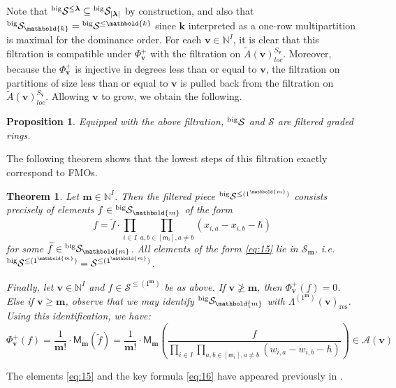 \documentclass[11pt,reqno]{amsart}
\renewcommand{\mathbf}{\mathbold}
\numberwithin{equation}{section}
\newtheorem{Theorem}[equation]{Theorem}
\newtheorem{Proposition}[equation]{Proposition}
\theoremstyle{definition}
\newcommand{\cA}{\mathcal{A}}
\newcommand{\cS}{\mathcal{S}}
\newcommand{\bk}{\mathbf{k}}
\newcommand{\bm}{\mathbf{m}}
\newcommand{\bv}{\mathbf{v}}
\newcommand{\NN}{\mathbb{N}}
\renewcommand{\tilde}[1]{\widetilde{#1}}
\newcommand{\leftexp}[2]{\vphantom{#2}^{#1} #2}
\renewcommand{\bv}{\mathbf{v}} %
\newcommand{\sm}{\mathsf{m}}
\newcommand{\M}{\mathsf{M}}
\newcommand{\vertexset}{I}
\newcommand{\GT}{\Lambda}
\newcommand{\bla}{{\boldsymbol{\lambda}}}
\newcommand{\qzast}{\cA}
\newcommand{\res}{\mathrm{res}}
\newcommand{\GKLO}[1]{\tilde{A}(#1)_{loc}}
\newcommand{\shu}{\cS}
\newcommand{\preshu}{\leftexp{\mathrm{big}}{\cS}}
\begin{document}
Note that $\preshu^{\leq \bla} \subseteq \preshu_{|\bla|}$ by construction, and also that $\preshu_{\bk} = \preshu^{\leq \bk}$ since $\bk$ interpreted as a one-row multipartition is maximal for the dominance order. 
For each $\bv \in \NN^I$, it is clear that this filtration is compatible under $\Phi^+_\bv$ with the filtration on $\GKLO{\bv}^{S_{\bv}}$.
Moreover, because the $\Phi_\bv^+$ is injective in degrees less than or equal to $\bv$, the filtration on partitions of size less than or equal to $\bv$ is pulled back from the filtration on $\GKLO{\bv}^{S_{\bv}}$. Allowing $\bv$ to grow, we obtain the following.

\begin{Proposition}
    Equipped with the above filtration, $\preshu$ and $\shu$ are filtered graded rings.
\end{Proposition}




The following theorem shows that the lowest steps of this filtration exactly correspond to FMOs. 
\begin{Theorem}
\label{thm:lowest-part-of-filtration-is-fmo}
Let $\bm \in \NN^\vertexset$. Then the filtered piece $\preshu^{\leq (1^{\bm})}$ consists precisely of elements $f \in \preshu_\bm$ of the form 
\begin{equation}
  \label{eq:15}
  f = \tilde{f} \cdot \prod_{i \in \vertexset} \prod_{a,b \in [\sm_i], a \neq b} (x_{i,a} - x_{i,b} - \hbar)  
\end{equation}
for some $\tilde{f} \in \preshu_{\bm}$. All elements of the form \eqref{eq:15} lie in $\cS_{\bm}$, i.e. $\preshu^{\leq (1^{\bm})} = \cS^{\leq (1^{\bm})}$.

Finally, let $\bv \in \NN^\vertexset$ and $f \in \shu^{\leq (1^\bm)}$ be as above.  If $\bv \not\geq \bm$, then $\Phi^+_\bv(f) = 0$.  Else if $\bv \geq \bm$, observe that we may identify $\preshu_{\bm}$ with $\GT^{(1^\bm)}(\bv)_{\res}$.  Using this identification, we have:
\begin{equation}
  \label{eq:16}
  \Phi^+_{\bv}\left( f\right)  = \frac{1}{\bm!} \cdot \M_{\bm}(\tilde{f}) 
  =  \frac{1}{\bm!} \cdot \M_{\bm}\left(\frac{f}{\prod_{i \in \vertexset} \prod_{a,b \in [\sm_i], a \neq b} (w_{i,a} - w_{i,b} - \hbar)  }\right) \in \qzast(\bv)
\end{equation}
\end{Theorem}
The elements \eqref{eq:15} and the key formula \eqref{eq:16} have appeared previously in \cite{FT2,Tsymbaliuk2,JN26}.
\end{document}
